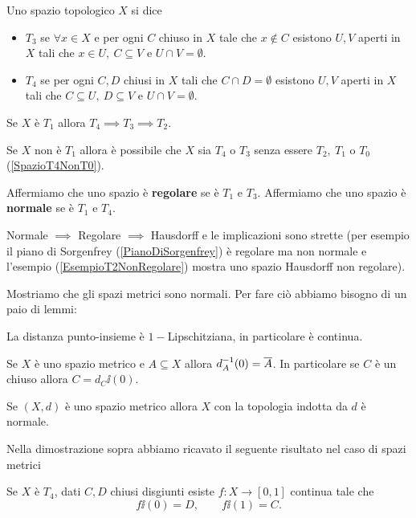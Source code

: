 \begin{multicols*}{2}
\begin{definition}
Uno spazio topologico $X$ si dice
\begin{itemize}[noitemsep]
\item $T_3$ se $\forall x\in X$ e per ogni $C$ chiuso in $X$ tale che $x\notin C$ esistono $U,V$ aperti in $X$ tali che $x\in U,\ C\subseteq V$ e $U\cap V=\emptyset$.
\item $T_4$ se per ogni $C,D$ chiusi in $X$ tali che $C\cap D=\emptyset$ esistono $U,V$ aperti in $X$ tali che $C\subseteq U,\ D\subseteq V$ e $U\cap V=\emptyset$.
\end{itemize}
\end{definition}
\begin{remark}
Se $X$ è $T_1$ allora $T_4\implies T_3\implies T_2$.
\end{remark}
\begin{remark}
Se $X$ non è $T_1$ allora è possibile che $X$ sia $T_4$ o $T_3$ senza essere $T_2,\ T_1$ o $T_0$ (\ref{SpazioT4NonT0}).
\end{remark}

\begin{definition}
Affermiamo che uno spazio è \textbf{regolare} se è $T_1$ e $T_3$. Affermiamo che uno spazio è \textbf{normale} se è $T_1$ e $T_4$.
\end{definition}
\begin{remark}
Normale $\implies$ Regolare $\implies$ Hausdorff e le implicazioni sono strette (per esempio il piano di Sorgenfrey (\ref{PianoDiSorgenfrey}) è regolare ma non normale e l'esempio (\ref{EsempioT2NonRegolare}) mostra uno spazio Hausdorff non regolare).
\end{remark}

\noindent Mostriamo che gli spazi metrici sono normali. Per fare ciò abbiamo bisogno di un paio di lemmi:
\begin{lemma}
La distanza punto-insieme è $1-$Lipschitziana, in particolare è continua.
\end{lemma}
\begin{lemma}
Se $X$ è uno spazio metrico e $A\subseteq X$ allora $d_A^{-1}(0)=\overline{A}$. In particolare se $C$ è un chiuso allora $C=d_C\ii(0)$.
\end{lemma}

\begin{proposition}
Se $(X,d)$ è uno spazio metrico allora $X$ con la topologia indotta da $d$ è normale.
\end{proposition}
\noindent Nella dimostrazione sopra abbiamo ricavato il seguente risultato nel caso di spazi metrici
\begin{proposition}
Se $X$ è $T_4$, dati $C,D$ chiusi disgiunti esiste $f:X\to[0,1]$ continua tale che
\[f\ii(0)=D,\qquad f\ii(1)=C.\]
\end{proposition}
\vspace{0.5cm}


\end{multicols*}
